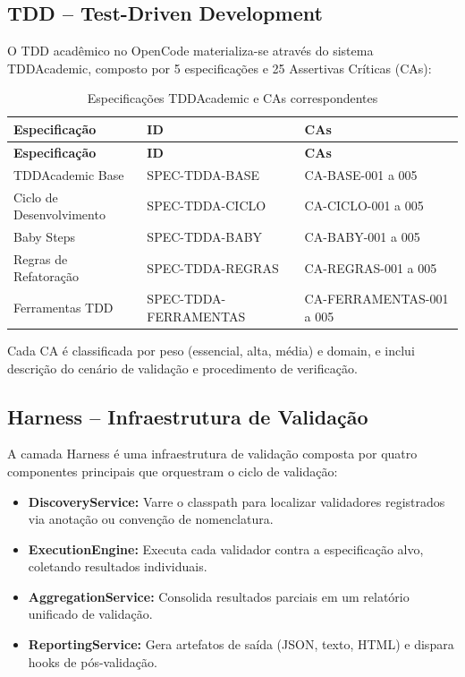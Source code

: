 \documentclass[
  brazil,
  sumario=tradicional,
  10pt
]{abntex2}
\begin{document}
\subsection{TDD -- Test-Driven Development}

O TDD acadêmico no OpenCode materializa-se através do sistema TDDAcademic,
composto por 5 especificações e 25 Assertivas Críticas (CAs):

\begin{longtable}{lll}
  \caption{Especificações TDDAcademic e CAs correspondentes}
  \label{tab:tddacademic}\\
  \toprule
  \textbf{Especificação} & \textbf{ID} & \textbf{CAs} \\
  \midrule
  \endfirsthead
  \toprule
  \textbf{Especificação} & \textbf{ID} & \textbf{CAs} \\
  \midrule
  \endhead
  \bottomrule
  \endfoot
  TDDAcademic Base & SPEC-TDDA-BASE & CA-BASE-001 a 005 \\
  Ciclo de Desenvolvimento & SPEC-TDDA-CICLO & CA-CICLO-001 a 005 \\
  Baby Steps & SPEC-TDDA-BABY & CA-BABY-001 a 005 \\
  Regras de Refatoração & SPEC-TDDA-REGRAS & CA-REGRAS-001 a 005 \\
  Ferramentas TDD & SPEC-TDDA-FERRAMENTAS & CA-FERRAMENTAS-001 a 005 \\
\end{longtable}

Cada CA é classificada por peso (essencial, alta, média) e domain, e
inclui descrição do cenário de validação e procedimento de verificação.

\subsection{Harness -- Infraestrutura de Validação}

A camada Harness é uma infraestrutura de validação composta por quatro
componentes principais que orquestram o ciclo de validação:

\begin{itemize}
  \item \textbf{DiscoveryService:} Varre o classpath para localizar
    validadores registrados via anotação ou convenção de nomenclatura.
  \item \textbf{ExecutionEngine:} Executa cada validador contra a
    especificação alvo, coletando resultados individuais.
  \item \textbf{AggregationService:} Consolida resultados parciais em
    um relatório unificado de validação.
  \item \textbf{ReportingService:} Gera artefatos de saída (JSON, texto,
    HTML) e dispara hooks de pós-validação.
\end{itemize}
\end{document}
